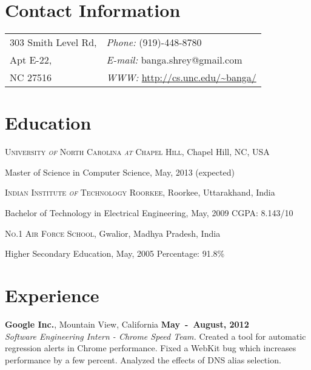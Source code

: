 \documentclass[margin,line]{res}
\newenvironment{list1}{
  \begin{list}{\ding{113}}{%
      \setlength{\itemsep}{0in}
      \setlength{\parsep}{0in} \setlength{\parskip}{0in}
      \setlength{\topsep}{0in} \setlength{\partopsep}{0in} 
      \setlength{\leftmargin}{0.17in}}}{\end{list}}
\begin{document}

\begin{resume}
\section{\sc Contact Information}
\vspace{.05in}
\begin{tabular}{@{}p{2in}p{4in}}
303 Smith Level Rd, & {\it Phone:}  (919)-448-8780 \\            
Apt E-22, & {\it E-mail:}  banga.shrey@gmail.com \\
NC 27516& {\it WWW:} \url{http://cs.unc.edu/~banga/} \\
\end{tabular}

\section{\sc Education}
\textsc{University \textit{of} North Carolina \textit{at} Chapel Hill}, Chapel Hill, NC, USA\\
\vspace*{-.1in}
\begin{list1}
\item[] Master of Science in Computer Science, May, 2013 (expected)
\end{list1}

\textsc{Indian Institute \textit{of} Technology Roorkee}, Roorkee, Uttarakhand, India\\
\vspace*{-.1in}
\begin{list1}
\item[] Bachelor of Technology in Electrical Engineering, May, 2009 \hfill {CGPA: 8.143/10}
\end{list1}

\textsc{No.1 Air Force School}, Gwalior, Madhya Pradesh, India\\
\vspace*{-.1in}
\begin{list1}
\item[] Higher Secondary Education,  May, 2005 \hfill {Percentage: 91.8\%}
\end{list1}

\section{\sc Experience}
{\bf Google Inc.}, Mountain View, California \hfill {\bf May~-~August, 2012}\\
{\em Software Engineering Intern - Chrome Speed Team.}
Created a tool for automatic regression alerts in Chrome performance.
Fixed a WebKit bug which increases performance by a few percent.
Analyzed the effects of DNS alias selection.


\end{resume}
\end{document}
